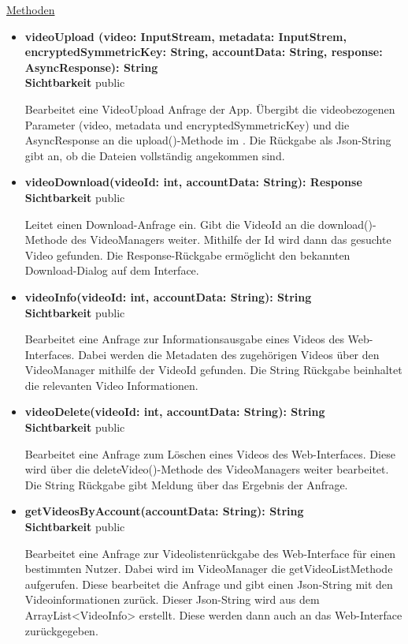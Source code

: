 \underline{Methoden}
\begin{itemize}
\itemsep0pt
\item \textbf{videoUpload (video: InputStream, metadata: InputStrem, encryptedSymmetricKey: String, accountData: String, response: AsyncResponse): String}\hfill\\
\textbf{Sichtbarkeit} public

Bearbeitet eine VideoUpload Anfrage der App. Übergibt die videobezogenen Parameter (video, metadata und encryptedSymmetricKey) und die AsyncResponse an die upload()-Methode im . Die Rückgabe als Json-String gibt an, ob die Dateien vollständig angekommen sind. 

\item \textbf{videoDownload(videoId: int, accountData: String): Response}\hfill\\
\textbf{Sichtbarkeit} public

Leitet einen Download-Anfrage ein. Gibt die VideoId an die download()-Methode des VideoManagers weiter. Mithilfe der Id wird dann das gesuchte Video gefunden. Die Response-Rückgabe ermöglicht den bekannten Download-Dialog auf dem Interface.

\item \textbf{videoInfo(videoId: int, accountData: String): String}\hfill\\
\textbf{Sichtbarkeit} public

Bearbeitet eine Anfrage zur Informationsausgabe eines Videos des Web-Interfaces. Dabei werden die Metadaten des zugehörigen Videos über den VideoManager mithilfe der VideoId gefunden. Die String Rückgabe beinhaltet die relevanten Video Informationen.

\item \textbf{videoDelete(videoId: int, accountData: String): String}\hfill\\
\textbf{Sichtbarkeit} public

Bearbeitet eine Anfrage zum Löschen eines Videos des Web-Interfaces. Diese wird über die deleteVideo()-Methode des VideoManagers weiter bearbeitet. Die String Rückgabe gibt Meldung über das Ergebnis der Anfrage.

\item \textbf{getVideosByAccount(accountData: String): String}\hfill\\
\textbf{Sichtbarkeit} public  

Bearbeitet eine Anfrage zur Videolistenrückgabe des Web-Interface für einen bestimmten Nutzer. Dabei wird im VideoManager die getVideoListMethode aufgerufen. Diese bearbeitet die Anfrage und gibt einen Json-String mit den Videoinformationen zurück. Dieser Json-String wird aus dem ArrayList<VideoInfo> erstellt. Diese werden dann auch an das Web-Interface zurückgegeben. 


\end{itemize}
